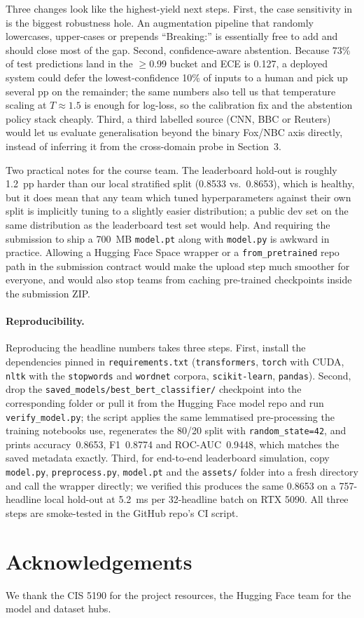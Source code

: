 \documentclass[10pt]{article}
\begin{document}
Three changes look like the highest-yield next steps. First, the case sensitivity in  is the biggest robustness hole. An augmentation pipeline that randomly lowercases, upper-cases or prepends ``Breaking:'' is essentially free to add and should close most of the gap. Second, confidence-aware abstention. Because 73\% of test predictions land in the $\geq$0.99 bucket and ECE is 0.127, a deployed system could defer the lowest-confidence 10\% of inputs to a human and pick up several pp on the remainder; the same numbers also tell us that temperature scaling at $T\!\approx\!1.5$ is enough for log-loss, so the calibration fix and the abstention policy stack cheaply. Third, a third labelled source (CNN, BBC or Reuters) would let us evaluate generalisation beyond the binary Fox/NBC axis directly, instead of inferring it from the cross-domain probe in Section~3.

Two practical notes for the course team. The leaderboard hold-out is roughly 1.2~pp harder than our local stratified split (0.8533 vs.~0.8653), which is healthy, but it does mean that any team which tuned hyperparameters against their own split is implicitly tuning to a slightly easier distribution; a public dev set on the same distribution as the leaderboard test set would help. And requiring the submission to ship a 700~MB \texttt{model.pt} along with \texttt{model.py} is awkward in practice. Allowing a Hugging Face Space wrapper or a \texttt{from\_pretrained} repo path in the submission contract would make the upload step much smoother for everyone, and would also stop teams from caching pre-trained checkpoints inside the submission ZIP.

\paragraph{Reproducibility.} Reproducing the headline numbers takes three steps. First, install the dependencies pinned in \texttt{requirements.txt} (\texttt{transformers}, \texttt{torch} with CUDA, \texttt{nltk} with the \texttt{stopwords} and \texttt{wordnet} corpora, \texttt{scikit-learn}, \texttt{pandas}). Second, drop the \texttt{saved\_models/best\_bert\_classifier/} checkpoint into the corresponding folder or pull it from the Hugging Face model repo and run \texttt{verify\_model.py}; the script applies the same lemmatised pre-processing the training notebooks use, regenerates the 80/20 split with \texttt{random\_state=42}, and prints accuracy~0.8653, F1~0.8774 and ROC-AUC~0.9448, which matches the saved metadata exactly. Third, for end-to-end leaderboard simulation, copy \texttt{model.py}, \texttt{preprocess.py}, \texttt{model.pt} and the \texttt{assets/} folder into a fresh directory and call the wrapper directly; we verified this produces the same 0.8653 on a 757-headline local hold-out at 5.2~ms per 32-headline batch on RTX 5090. All three steps are smoke-tested in the GitHub repo's CI script.

\section*{Acknowledgements}
We thank the CIS 5190 for the project resources, the Hugging Face team for the model and dataset hubs.
\end{document}
